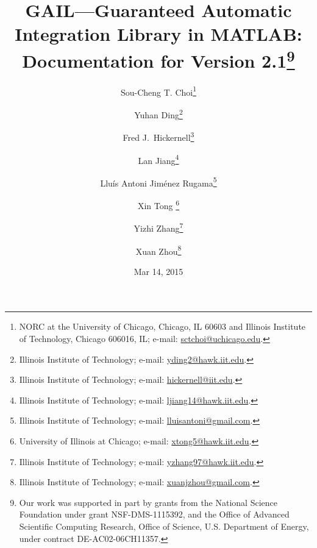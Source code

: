 \documentclass[10pt]{article}
\begin{document}
\begin{comment}
   \item See Also
   \item References
   \item meanMCBer\_g
   \item Syntax
   \item Description
   \item Guarantee
   \item Examples
   \item See Also
   \item References
   \item cubMC\_g
   \item Syntax
   \item Description
   \item Guarantee
   \item Examples
   \item See Also
   \item References
   \item cubLattice\_g
   \item Syntax
   \item Description
   \item Guarantee
   \item Examples
   \item See Also
   \item References
   \item cubSobol\_g
   \item Syntax
   \item Description
   \item Guarantee
   \item Examples
   \item See Also
   \item References
   \item Installation Instructions
\end{itemize}
\end{comment}

\title{GAIL---Guaranteed Automatic Integration Library in MATLAB: Documentation for Version 2.1\thanks{Our work was supported in part by grants from the National Science Foundation under grant NSF-DMS-1115392, and the Office of Advanced Scientific Computing Research, Office of Science, U.S. Department of Energy, under contract DE-AC02-06CH11357.
  }}
\author{Sou-Cheng T. Choi\thanks{NORC at the University of
    Chicago, Chicago, IL 60603 and Illinois Institute of Technology, Chicago 606016, IL; e-mail: \url{sctchoi@uchicago.edu}.} \and
    Yuhan Ding\thanks{Illinois Institute of Technology; e-mail: \url{yding2@hawk.iit.edu}.}  \and
    Fred J.~Hickernell\thanks{Illinois Institute of Technology; e-mail: \url{hickernell@iit.edu}.}  \and
    Lan Jiang\thanks{ Illinois Institute of Technology; e-mail: \url{ljiang14@hawk.iit.edu}.}  \and
    Llu\'is Antoni Jim\'enez Rugama\thanks{Illinois Institute of Technology; e-mail: \url{ lluisantoni@gmail.com}.}  \and
    Xin Tong  \thanks{University of Illinois at Chicago; e-mail: \url{xtong5@hawk.iit.edu}.}  \and
    Yizhi Zhang\thanks{Illinois Institute of Technology; e-mail: \url{yzhang97@hawk.iit.edu}.}  \and
    Xuan Zhou\thanks{Illinois Institute of Technology; e-mail: \url{xuanjzhou@gmail.com}.} 
}\date{Mar 14, 2015}
 
\end{document}
